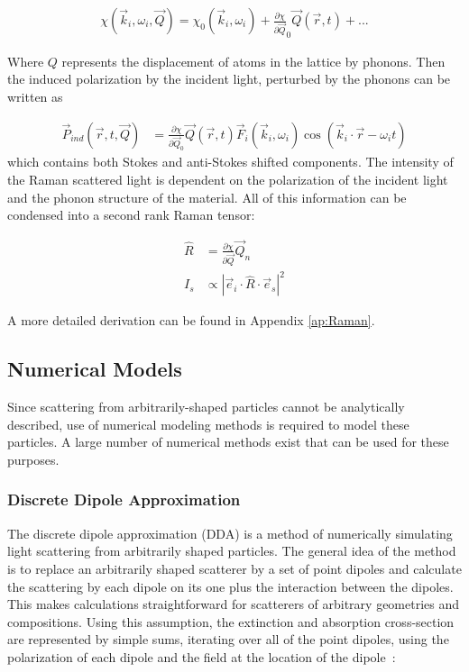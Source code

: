             \begin{align}
                \chi(\vec{k}_i, \omega_i, \vec{Q}) = \chi_0(\vec{k}_i, \omega_i) + \frac{\partial\chi}{\partial\vec{Q}}_0\vec{Q}(\vec{r},t) + ...
            \end{align}

            Where $Q$ represents the displacement of atoms in the lattice by phonons.
            Then the induced polarization by the incident light, perturbed by the phonons can be written as

            \begin{align}
                \vec{P}_{ind}(\vec{r}, t, \vec{Q}) &= \frac{\partial\chi}{\partial\vec{Q}_0}\vec{Q}(\vec{r},t)
                                                        \vec{F}_i(\vec{k}_i, \omega_i)\cos(\vec{k}_i\cdot\vec{r}-\omega_i t)
            \end{align}
            which contains both Stokes and anti-Stokes shifted components. The intensity of the Raman scattered light
            is dependent on the polarization of the incident light and the phonon structure of the material. All of this
            information can be condensed into a second rank Raman tensor:

            \begin{align}
                \hat{R} &= \frac{\partial\chi}{\partial\vec{Q}}\vec{Q}_n \\
                I_s &\propto | \vec{e}_i \cdot \hat{R} \cdot\vec{e}_s|^2
            \end{align}

            A more detailed derivation can be found in Appendix \ref{ap:Raman}.

    \subsection{Numerical Models}
            Since scattering from arbitrarily-shaped particles cannot be analytically described, use of numerical modeling methods
        is required to model these particles. A large number of numerical methods exist that can be used for these purposes.

        \subsubsection{Discrete Dipole Approximation}
                The discrete dipole approximation (DDA) is a method of numerically simulating light scattering from arbitrarily shaped particles.
            The general idea of the method is to replace an arbitrarily shaped scatterer by a set of point dipoles and calculate the
            scattering by each dipole on its one plus the interaction between the dipoles. This makes calculations straightforward
            for scatterers of arbitrary geometries and compositions. Using this assumption, the extinction and absorption cross-section
            are represented by simple sums, iterating over all of the point dipoles, using the polarization of each dipole and the field at
            the location of the dipole~\cite{yurkin2007discrete}:

